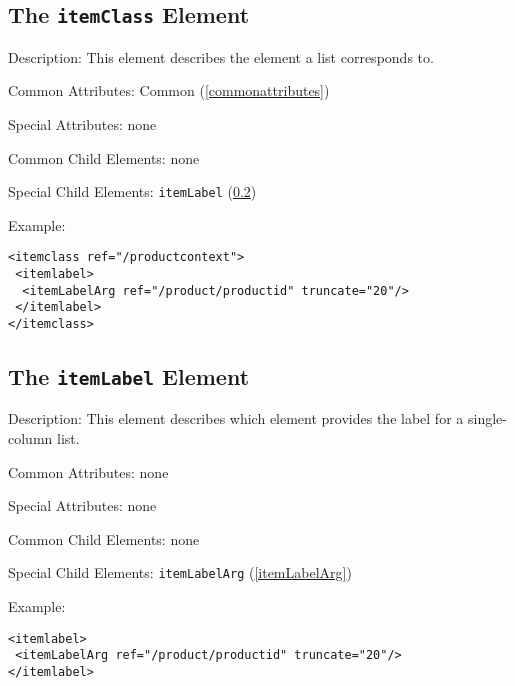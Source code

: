 \subsection{ The \texttt{itemClass} Element}
\label{itemClass}
\begin{description}
 \item Description: This element describes the element a list corresponds to.

 \item Common Attributes: Common (\ref{commonattributes})

 \item Special Attributes: none

 \item Common Child Elements: none

 \item Special Child Elements: \texttt{itemLabel} (\ref{itemLabel})

 \item Example: 

\begin{lstlisting}[caption=\texttt{itemClass} Element]
<itemclass ref="/productcontext">
 <itemlabel>
  <itemLabelArg ref="/product/productid" truncate="20"/>
 </itemlabel>
</itemclass>
\end{lstlisting}
\end{description}





\subsection{ The \texttt{itemLabel} Element}
\label{itemLabel}
\begin{description}
 \item Description: This element describes which element provides the label for a single-column list.

 \item Common Attributes: none

 \item Special Attributes: none

 \item Common Child Elements: none

 \item Special Child Elements: \texttt{itemLabelArg} (\ref{itemLabelArg})

 \item Example: 

\begin{lstlisting}[caption=\texttt{itemLabel} Element]
<itemlabel>
 <itemLabelArg ref="/product/productid" truncate="20"/>
</itemlabel>
\end{lstlisting}
\end{description}





